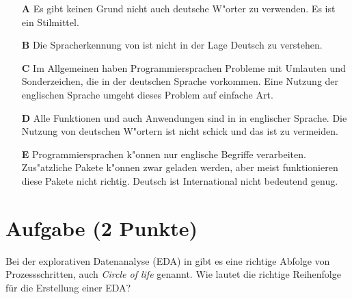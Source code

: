 \documentclass[a4paper, 10pt]{scrartcl}\usepackage[]{graphicx}\usepackage[]{xcolor}
\begin{document}
\begin{enumerate}
\item [\textbf{A} \msquare] Es gibt keinen Grund nicht auch deutsche W{"o}rter zu verwenden. Es ist ein Stilmittel.
\item [\textbf{B} \msquare] Die Spracherkennung von \Rlogo ist nicht in der Lage Deutsch zu verstehen.
\item [\textbf{C} \msquare] Im Allgemeinen haben Programmiersprachen Probleme mit Umlauten und Sonderzeichen, die in der deutschen Sprache vorkommen. Eine Nutzung der englischen Sprache umgeht dieses Problem auf einfache Art.
\item [\textbf{D} \msquare] Alle Funktionen und auch Anwendungen sind in \Rlogo in englischer Sprache. Die Nutzung von deutschen W{"o}rtern ist nicht schick und das ist zu vermeiden.
\item [\textbf{E} \msquare] Programmiersprachen k{"o}nnen nur englische Begriffe verarbeiten. Zus{"a}tzliche Pakete k{"o}nnen zwar geladen werden, aber meist funktionieren diese Pakete nicht richtig. Deutsch ist International nicht bedeutend genug.
\end{enumerate}

\section{Aufgabe \hfill (2 Punkte)}

Bei der explorativen Datenanalyse (EDA) in \Rlogo gibt es eine richtige Abfolge von Prozessschritten, auch \textit{Circle of life} genannt. Wie lautet die richtige Reihenfolge f{\"u}r die Erstellung einer EDA?
\end{document}
